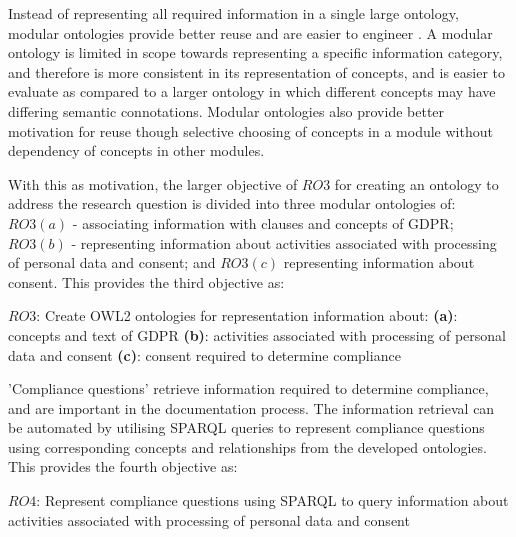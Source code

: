 Instead of representing all required information in a single large ontology, modular ontologies provide better reuse and are easier to engineer \cite{suarez-figueroa_neon_2012}.
A modular ontology is limited in scope towards representing a specific information category, and therefore is more consistent in its representation of concepts, and is easier to evaluate as compared to a larger ontology in which different concepts may have differing semantic connotations.
Modular ontologies also provide better motivation for reuse though selective choosing of concepts in a module without dependency of concepts in other modules.

With this as motivation, the larger objective of $RO3$ for creating an ontology to address the research question is divided into three modular ontologies of: $RO3(a)$ - associating information with clauses and concepts of GDPR; $RO3(b)$ - representing information about activities associated with processing of personal data and consent; and $RO3(c)$ representing information about consent.
This provides the third objective as:
\begin{framed}
$RO3$: Create OWL2 ontologies for representation information about:
\newline\indent\indent\textbf{(a)}: concepts and text of GDPR
\newline\indent\indent\textbf{(b)}: activities associated with processing of personal data and consent
\newline\indent\indent\textbf{(c)}: consent required to determine compliance
\end{framed}

'Compliance questions' retrieve information required to determine compliance, and are important in the documentation process. The information retrieval can be automated by utilising SPARQL queries to represent compliance questions using corresponding concepts and relationships from the developed ontologies. This provides the fourth objective as:
\begin{framed}
$RO4$: Represent compliance questions using SPARQL to query information about activities associated with processing of personal data and consent
\end{framed}

